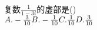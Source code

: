 \documentclass[class=ctexart,crop=false]{standalone}
\begin{document}
   复数$\frac{1}{1-3i}$的虚部是\hfill (\qquad)\\
    $A. -\frac{3}{10}\hfill B. -\frac{1}{10}\hfill C. \frac{1}{10}\hfill D. \frac{3}{10}\hfill$
\end{document}
